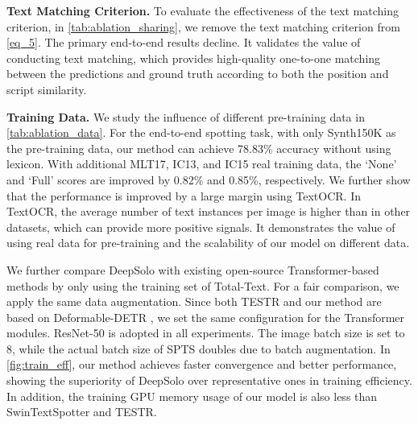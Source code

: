 \documentclass[10pt,twocolumn,letterpaper]{article}
\begin{document}
\begin{table}[!t]
    \centering
    \setlength{\tabcolsep}{2pt}
\caption{Influence of the training data. Volume: dataset volume.}
\label{tab:ablation_data}
\vspace{-3mm}
\end{table}

\noindent \textbf{Text Matching Criterion.} To evaluate the effectiveness of the text matching criterion, in \cref{tab:ablation_sharing}, we remove the text matching criterion from \cref{eq_5}. The primary end-to-end results decline. It validates the value of conducting text matching, which provides high-quality one-to-one matching between the predictions and ground truth according to both the position and script similarity.

\noindent \textbf{Training Data.} We study the influence of different pre-training data in \cref{tab:ablation_data}. For the end-to-end spotting task, with only Synth150K as the pre-training data, our method can achieve 78.83\% accuracy without using lexicon. With additional MLT17, IC13, and IC15 real training data, the `None' and `Full' scores are improved by 0.82\% and 0.85\%, respectively. We further show that the performance is improved by a large margin using TextOCR. In TextOCR, the average number of text instances per image is higher than in other datasets, which can provide more positive signals. It demonstrates the value of using real data for pre-training and the scalability of our model on different data. 


We further compare DeepSolo with existing open-source Transformer-based methods \cite{huang2022swintextspotter,zhang2022text,peng2022spts} by only using the training set of Total-Text. For a fair comparison, we apply the same data augmentation. Since both TESTR and our method are based on Deformable-DETR \cite{zhu2020deformable}, we set the same configuration for the Transformer modules. ResNet-50 \cite{he2016deep} is adopted in all experiments. The image batch size is set to 8, while the actual batch size of SPTS doubles due to batch augmentation. In \cref{fig:train_eff}, our method achieves faster convergence and better performance, showing the superiority of DeepSolo over representative ones in training efficiency. 
In addition, the training GPU memory usage of our model is also less than SwinTextSpotter and TESTR.
\end{document}

